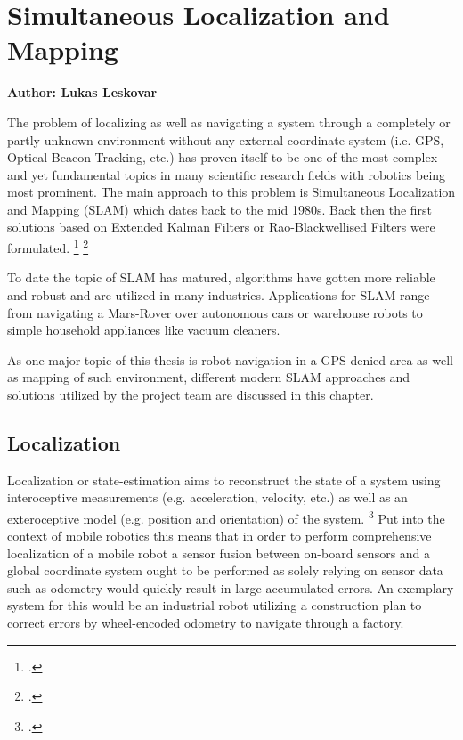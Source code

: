 \chapter{Simultaneous Localization and Mapping}
\label{chapter:slam}

\textbf{Author: Lukas Leskovar} 

The problem of localizing as well as navigating a system through a completely or partly unknown environment without any external coordinate system (i.e. GPS, Optical Beacon Tracking, etc.) has proven itself to be one of the most complex and yet fundamental topics in many scientific research fields with robotics being most prominent. The main approach to this problem is Simultaneous Localization and Mapping (SLAM) which dates back to the mid 1980s. Back then the first solutions based on Extended Kalman Filters or Rao-Blackwellised Filters were formulated. \footcite{durrantSlam2006}  \footcite{cadenaSlamFuture2016}

To date the topic of SLAM has matured, algorithms have gotten more reliable and robust and are utilized in many industries. Applications for SLAM range from navigating a Mars-Rover over autonomous cars or warehouse robots to simple household appliances like vacuum cleaners. 

As one major topic of this thesis is robot navigation in a GPS-denied area as well as mapping of such environment, different modern SLAM approaches and solutions utilized by the project team are discussed in this chapter.

\section{Localization}
Localization or state-estimation aims to reconstruct the state of a system using interoceptive measurements (e.g. acceleration, velocity, etc.) as well as an exteroceptive model (e.g. position and orientation) of the system. \footcite{barfootStateEstimation2017}
Put into the context of mobile robotics this means that in order to perform comprehensive localization of a mobile robot a sensor fusion between on-board sensors and a global coordinate system ought to be performed as solely relying on sensor data such as odometry would quickly result in large accumulated errors.
An exemplary system for this would be an industrial robot utilizing a construction plan to correct errors by wheel-encoded odometry to navigate through a factory. 

